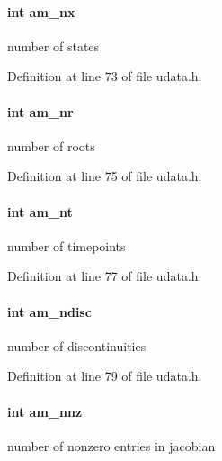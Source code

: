 \paragraph[{am\+\_\+nx}]{\setlength{\rightskip}{0pt plus 5cm}int am\+\_\+nx}\label{struct_user_data_a00ba9cf99f8f02b663241bb76b76ce96}
number of states 

Definition at line 73 of file udata.\+h.

\hypertarget{struct_user_data_aa56d89d6184e84681395d1b00069f883}{}
\paragraph[{am\+\_\+nr}]{\setlength{\rightskip}{0pt plus 5cm}int am\+\_\+nr}\label{struct_user_data_aa56d89d6184e84681395d1b00069f883}
number of roots 

Definition at line 75 of file udata.\+h.

\hypertarget{struct_user_data_a08ea6ecb241cd86a6f171761a48e27dd}{}
\paragraph[{am\+\_\+nt}]{\setlength{\rightskip}{0pt plus 5cm}int am\+\_\+nt}\label{struct_user_data_a08ea6ecb241cd86a6f171761a48e27dd}
number of timepoints 

Definition at line 77 of file udata.\+h.

\hypertarget{struct_user_data_adc94a5ce0a5314355aae8e05060c13da}{}
\paragraph[{am\+\_\+ndisc}]{\setlength{\rightskip}{0pt plus 5cm}int am\+\_\+ndisc}\label{struct_user_data_adc94a5ce0a5314355aae8e05060c13da}
number of discontinuities 

Definition at line 79 of file udata.\+h.

\hypertarget{struct_user_data_a43ad1c7f840dc744be4251902a4ae91d}{}
\paragraph[{am\+\_\+nnz}]{\setlength{\rightskip}{0pt plus 5cm}int am\+\_\+nnz}\label{struct_user_data_a43ad1c7f840dc744be4251902a4ae91d}
number of nonzero entries in jacobian 

